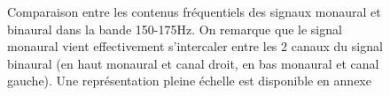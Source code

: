 \begin{figure}[h!]
	\caption{\label{comp_mon_min_zoom_150_175}Comparaison entre les contenus fréquentiels des signaux monaural et
	binaural dans la bande 150-175Hz. On remarque que le signal monaural vient effectivement s'intercaler entre les
	2 canaux du signal binaural (en haut monaural et canal droit, en bas monaural et canal gauche). Une représentation
pleine échelle est disponible en annexe}
\end{figure}
